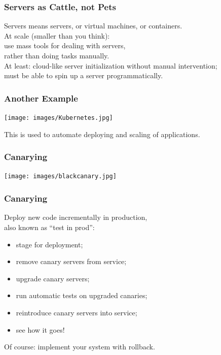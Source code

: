 \begin{frame}
\frametitle{Servers as Cattle, not Pets}

\large

Servers means servers, or virtual machines, or containers.\\[1em]

At scale (smaller than you think):\\
use mass tools for dealing with servers, \\
rather than doing tasks manually. \\[1em]

At least: cloud-like server initialization without manual intervention;\\
must be able to spin up a server programmatically.


\end{frame}



\begin{frame}
\frametitle{Another Example}

\begin{center}
	\texttt{[image: images/Kubernetes.jpg]}
\end{center}

This is used to automate deploying and scaling of applications.

\end{frame}

\begin{frame}
\frametitle{Canarying}

\begin{center}
	\texttt{[image: images/blackcanary.jpg]}
\end{center}

\end{frame}



\begin{frame}
\frametitle{Canarying}

\large

Deploy new code incrementally in production, \\
also known as ``test in prod'':


\begin{itemize}
\item stage for deployment;
\item remove canary servers from service;
\item upgrade canary servers;
\item run automatic tests on upgraded canaries;
\item reintroduce canary servers into service;
\item see how it goes!
\end{itemize}

Of course: implement your system with rollback.


\end{frame}







